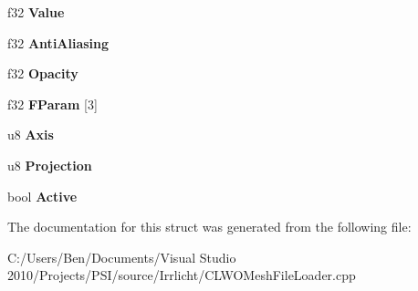 \begin{DoxyCompactItemize}
\item 
\hypertarget{structirr_1_1scene_1_1t_l_w_o_texture_info_ab61c6ef299dbaafdb83434f263a4bdf7}{f32 {\bfseries Value}}\label{structirr_1_1scene_1_1t_l_w_o_texture_info_ab61c6ef299dbaafdb83434f263a4bdf7}

\item 
\hypertarget{structirr_1_1scene_1_1t_l_w_o_texture_info_a92f73b69f0b2d24b2c27038bafe46f11}{f32 {\bfseries Anti\-Aliasing}}\label{structirr_1_1scene_1_1t_l_w_o_texture_info_a92f73b69f0b2d24b2c27038bafe46f11}

\item 
\hypertarget{structirr_1_1scene_1_1t_l_w_o_texture_info_aa922423c618e90508fd5fc7d4ac5fca1}{f32 {\bfseries Opacity}}\label{structirr_1_1scene_1_1t_l_w_o_texture_info_aa922423c618e90508fd5fc7d4ac5fca1}

\item 
\hypertarget{structirr_1_1scene_1_1t_l_w_o_texture_info_a25d75bc3e769ae923a5881462b8a4430}{f32 {\bfseries F\-Param} \mbox{[}3\mbox{]}}\label{structirr_1_1scene_1_1t_l_w_o_texture_info_a25d75bc3e769ae923a5881462b8a4430}

\item 
\hypertarget{structirr_1_1scene_1_1t_l_w_o_texture_info_aa06cb96dd6d2852273301da0fbe26bf4}{u8 {\bfseries Axis}}\label{structirr_1_1scene_1_1t_l_w_o_texture_info_aa06cb96dd6d2852273301da0fbe26bf4}

\item 
\hypertarget{structirr_1_1scene_1_1t_l_w_o_texture_info_af90c8925e66642db1a903eee9a1a2a19}{u8 {\bfseries Projection}}\label{structirr_1_1scene_1_1t_l_w_o_texture_info_af90c8925e66642db1a903eee9a1a2a19}

\item 
\hypertarget{structirr_1_1scene_1_1t_l_w_o_texture_info_a5748152e9a0fe6cb98317364f8aa7edf}{bool {\bfseries Active}}\label{structirr_1_1scene_1_1t_l_w_o_texture_info_a5748152e9a0fe6cb98317364f8aa7edf}

\end{DoxyCompactItemize}


The documentation for this struct was generated from the following file\-:\begin{DoxyCompactItemize}
\item 
C\-:/\-Users/\-Ben/\-Documents/\-Visual Studio 2010/\-Projects/\-P\-S\-I/source/\-Irrlicht/C\-L\-W\-O\-Mesh\-File\-Loader.\-cpp\end{DoxyCompactItemize}
